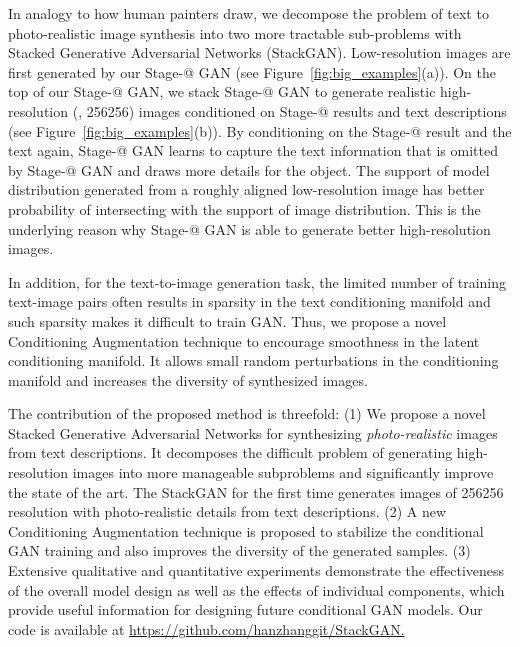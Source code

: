 \documentclass[10pt,twocolumn,letterpaper]{article}
\makeatletter
\newcommand{\Rmnum}[1]{\expandafter\@slowromancap\romannumeral #1@}
\makeatother
\begin{document}
 

In analogy to how human painters draw, we decompose the problem of text to photo-realistic image synthesis into two more tractable sub-problems with Stacked Generative Adversarial Networks (StackGAN). Low-resolution images are first generated by our Stage-\Rmnum{1} GAN (see Figure~\ref{fig:big_examples}(a)). On the top of our Stage-\Rmnum{1} GAN, we stack Stage-\Rmnum{2} GAN to generate realistic high-resolution (\eg, 256256) images conditioned on Stage-\Rmnum{1} results and text descriptions (see Figure~\ref{fig:big_examples}(b)). By conditioning on the Stage-\Rmnum{1} result and the text again, Stage-\Rmnum{2} GAN learns to capture the text information that is omitted by Stage-\Rmnum{1} GAN and draws more details for the object. The support of model distribution generated from a roughly aligned low-resolution image has better probability of intersecting with the support of image distribution. This is the underlying reason why Stage-\Rmnum{2} GAN is able to generate better high-resolution images.

In addition, for the text-to-image generation task, the limited number of training text-image pairs often results in sparsity in the text conditioning manifold and such sparsity makes it difficult to train GAN. Thus, we propose a novel Conditioning Augmentation technique to encourage smoothness in the latent conditioning manifold. It allows small random perturbations in the conditioning manifold and increases the diversity of synthesized images. 

The contribution of the proposed method is threefold: 
(1) We propose a novel Stacked Generative Adversarial Networks for synthesizing \emph{photo-realistic} images from text descriptions. It decomposes the difficult problem of generating high-resolution images into more manageable subproblems and significantly improve the state of the art. The StackGAN for the first time generates images of 256256 resolution with photo-realistic details from text descriptions. 
(2) A new Conditioning Augmentation technique is proposed to stabilize the conditional GAN training and also improves the diversity of the generated samples. 
(3) Extensive qualitative and quantitative experiments demonstrate the effectiveness of the overall model design as well as the effects of individual components, which provide useful information for designing future conditional GAN models. 
Our code is available at {\href{https://github.com/hanzhanggit/StackGAN}{https://github.com/hanzhanggit/StackGAN.}}
\end{document}
